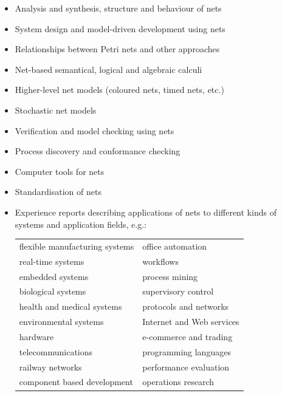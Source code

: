 \documentclass[10pt,a4paper]{article}
\begin{document}
\begin{multicols}{2}
\begin{itemize}
\item Analysis and synthesis, structure and behaviour of nets
\item System design and model-driven development using nets
\item Relationships between Petri nets and other approaches
\item Net-based semantical, logical and algebraic calculi
\item Higher-level net models (coloured nets, timed nets, etc.)
\item Stochastic net models
\item Verification and model checking using nets
\item Process discovery and conformance checking
\item Computer tools for nets
\item Standardisation of nets
\item Experience reports describing applications of nets to different kinds of systems
and application fields, e.g.:

	\begin{tabular}{ll}
	flexible manufacturing systems & office automation \\
	real-time systems & workflows \\
	embedded systems & process mining \\
	biological systems & supervisory control \\
	health and medical systems & protocols and networks \\
	environmental systems & Internet and Web services \\
	hardware & e-commerce and trading \\
	telecommunications & programming languages \\
	railway networks & performance evaluation \\
	component based development & operations research \\
	\end{tabular}
\end{itemize}
\end{multicols}
\end{document}
